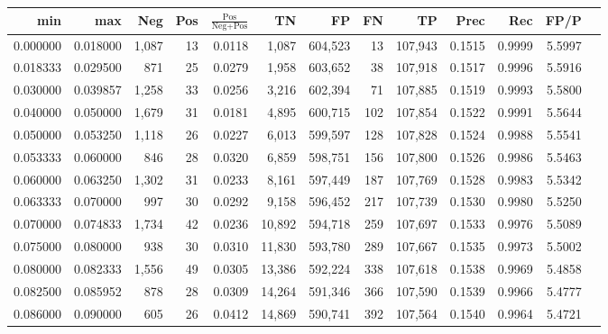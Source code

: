 \begin{tabular}{rrrrrrrrrrrrr}
\toprule
     min &      max &   Neg & Pos & $\frac{\text{Pos}}{\text{Neg}+\text{Pos}}$ &      TN &      FP &      FN &      TP &   Prec &    Rec &   FP/P \\
\midrule
0.000000 & 0.018000 & 1,087 &  13 &                                     0.0118 &   1,087 & 604,523 &      13 & 107,943 & 0.1515 & 0.9999 & 5.5997 \\
0.018333 & 0.029500 &   871 &  25 &                                     0.0279 &   1,958 & 603,652 &      38 & 107,918 & 0.1517 & 0.9996 & 5.5916 \\
0.030000 & 0.039857 & 1,258 &  33 &                                     0.0256 &   3,216 & 602,394 &      71 & 107,885 & 0.1519 & 0.9993 & 5.5800 \\
0.040000 & 0.050000 & 1,679 &  31 &                                     0.0181 &   4,895 & 600,715 &     102 & 107,854 & 0.1522 & 0.9991 & 5.5644 \\
0.050000 & 0.053250 & 1,118 &  26 &                                     0.0227 &   6,013 & 599,597 &     128 & 107,828 & 0.1524 & 0.9988 & 5.5541 \\
0.053333 & 0.060000 &   846 &  28 &                                     0.0320 &   6,859 & 598,751 &     156 & 107,800 & 0.1526 & 0.9986 & 5.5463 \\
0.060000 & 0.063250 & 1,302 &  31 &                                     0.0233 &   8,161 & 597,449 &     187 & 107,769 & 0.1528 & 0.9983 & 5.5342 \\
0.063333 & 0.070000 &   997 &  30 &                                     0.0292 &   9,158 & 596,452 &     217 & 107,739 & 0.1530 & 0.9980 & 5.5250 \\
0.070000 & 0.074833 & 1,734 &  42 &                                     0.0236 &  10,892 & 594,718 &     259 & 107,697 & 0.1533 & 0.9976 & 5.5089 \\
0.075000 & 0.080000 &   938 &  30 &                                     0.0310 &  11,830 & 593,780 &     289 & 107,667 & 0.1535 & 0.9973 & 5.5002 \\
0.080000 & 0.082333 & 1,556 &  49 &                                     0.0305 &  13,386 & 592,224 &     338 & 107,618 & 0.1538 & 0.9969 & 5.4858 \\
0.082500 & 0.085952 &   878 &  28 &                                     0.0309 &  14,264 & 591,346 &     366 & 107,590 & 0.1539 & 0.9966 & 5.4777 \\
0.086000 & 0.090000 &   605 &  26 &                                     0.0412 &  14,869 & 590,741 &     392 & 107,564 & 0.1540 & 0.9964 & 5.4721 \\

\end{tabular}
